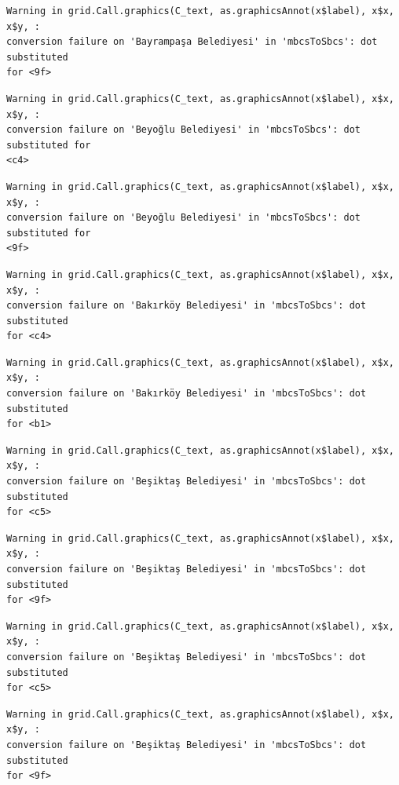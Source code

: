 \documentclass[
  11pt,
  a4paper,
  DIV=11,
  numbers=noendperiod]{scrartcl}
\begin{document}
\begin{verbatim}
Warning in grid.Call.graphics(C_text, as.graphicsAnnot(x$label), x$x, x$y, :
conversion failure on 'Bayrampaşa Belediyesi' in 'mbcsToSbcs': dot substituted
for <9f>
\end{verbatim}

\begin{verbatim}
Warning in grid.Call.graphics(C_text, as.graphicsAnnot(x$label), x$x, x$y, :
conversion failure on 'Beyoğlu Belediyesi' in 'mbcsToSbcs': dot substituted for
<c4>
\end{verbatim}

\begin{verbatim}
Warning in grid.Call.graphics(C_text, as.graphicsAnnot(x$label), x$x, x$y, :
conversion failure on 'Beyoğlu Belediyesi' in 'mbcsToSbcs': dot substituted for
<9f>
\end{verbatim}

\begin{verbatim}
Warning in grid.Call.graphics(C_text, as.graphicsAnnot(x$label), x$x, x$y, :
conversion failure on 'Bakırköy Belediyesi' in 'mbcsToSbcs': dot substituted
for <c4>
\end{verbatim}

\begin{verbatim}
Warning in grid.Call.graphics(C_text, as.graphicsAnnot(x$label), x$x, x$y, :
conversion failure on 'Bakırköy Belediyesi' in 'mbcsToSbcs': dot substituted
for <b1>
\end{verbatim}

\begin{verbatim}
Warning in grid.Call.graphics(C_text, as.graphicsAnnot(x$label), x$x, x$y, :
conversion failure on 'Beşiktaş Belediyesi' in 'mbcsToSbcs': dot substituted
for <c5>
\end{verbatim}

\begin{verbatim}
Warning in grid.Call.graphics(C_text, as.graphicsAnnot(x$label), x$x, x$y, :
conversion failure on 'Beşiktaş Belediyesi' in 'mbcsToSbcs': dot substituted
for <9f>
\end{verbatim}

\begin{verbatim}
Warning in grid.Call.graphics(C_text, as.graphicsAnnot(x$label), x$x, x$y, :
conversion failure on 'Beşiktaş Belediyesi' in 'mbcsToSbcs': dot substituted
for <c5>
\end{verbatim}

\begin{verbatim}
Warning in grid.Call.graphics(C_text, as.graphicsAnnot(x$label), x$x, x$y, :
conversion failure on 'Beşiktaş Belediyesi' in 'mbcsToSbcs': dot substituted
for <9f>
\end{verbatim}
\end{document}

